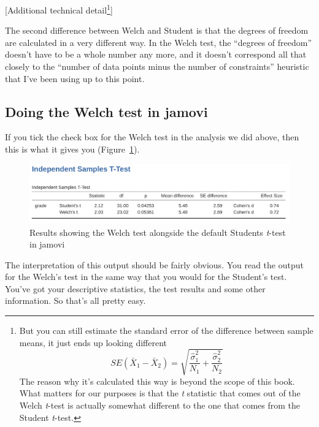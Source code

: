 \documentclass[
  a4paper,
]{book}
\begin{document}
{[}Additional technical detail\footnote{But you can still estimate the
  standard error of the difference between sample means, it just ends up
  looking different
  \[SE(\bar{X}_1-\bar{X}_2)=\sqrt{\frac{\hat{\sigma}_1^2}{N_1}+\frac{\hat{\sigma}_2^2}{N_2}}\]
  The reason why it's calculated this way is beyond the scope of this
  book. What matters for our purposes is that the \emph{t} statistic
  that comes out of the Welch \emph{t}-test is actually somewhat
  different to the one that comes from the Student \emph{t}-test.}{]}

The second difference between Welch and Student is that the degrees of
freedom are calculated in a very different way. In the Welch test, the
``degrees of freedom'' doesn't have to be a whole number any more, and
it doesn't correspond all that closely to the ``number of data points
minus the number of constraints'' heuristic that I've been using up to
this point.

\hypertarget{doing-the-welch-test-in-jamovi}{%
\subsection{Doing the Welch test in
jamovi}\label{doing-the-welch-test-in-jamovi}}

If you tick the check box for the Welch test in the analysis we did
above, then this is what it gives you (Figure~\ref{fig-fig11-11}).

\begin{figure}

\includegraphics[width=1\textwidth,height=\textheight]{images/fig11-11.png} \hfill{}

\caption{\label{fig-fig11-11}Results showing the Welch test alongside
the default Students \emph{t}-test in jamovi}

\end{figure}

The interpretation of this output should be fairly obvious. You read the
output for the Welch's test in the same way that you would for the
Student's test. You've got your descriptive statistics, the test results
and some other information. So that's all pretty easy.
\end{document}
